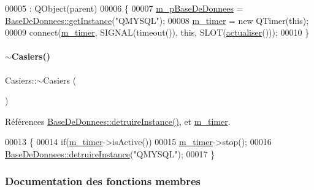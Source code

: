 \begin{DoxyCode}
00005                                 : QObject(parent)
00006 \{
00007     \hyperlink{class_casiers_ae6ac6b09a5cffe28291fc9b3289ff011}{m\_pBaseDeDonnees} = \hyperlink{class_base_de_donnees_a80028aa2b6b4fbf30fb2e36357b7d3d3}{BaseDeDonnees::getInstance}(\textcolor{stringliteral}{"QMYSQL"});
00008     \hyperlink{class_casiers_a2e2ee8b7f70d1c22acca56257d257ae6}{m\_timer} = \textcolor{keyword}{new} QTimer(\textcolor{keyword}{this});
00009     connect(\hyperlink{class_casiers_a2e2ee8b7f70d1c22acca56257d257ae6}{m\_timer}, SIGNAL(timeout()), \textcolor{keyword}{this}, SLOT(\hyperlink{class_casiers_a53ff5feefb50f5010943c94916be060f}{actualiser}()));
00010 \}
\end{DoxyCode}
\mbox{\label{class_casiers_a12018a7daf2c2ce7652ccedbefc545cc}} 
\paragraph{\texorpdfstring{$\sim$\+Casiers()}{~Casiers()}}
{\footnotesize\ttfamily Casiers\+::$\sim$\+Casiers (\begin{DoxyParamCaption}{ }\end{DoxyParamCaption})}



Références \hyperlink{class_base_de_donnees_a457401c0816b888c77ce915997545f4e}{Base\+De\+Donnees\+::detruire\+Instance()}, et \hyperlink{class_casiers_a2e2ee8b7f70d1c22acca56257d257ae6}{m\+\_\+timer}.


\begin{DoxyCode}
00013 \{
00014     \textcolor{keywordflow}{if}(\hyperlink{class_casiers_a2e2ee8b7f70d1c22acca56257d257ae6}{m\_timer}->isActive())
00015        \hyperlink{class_casiers_a2e2ee8b7f70d1c22acca56257d257ae6}{m\_timer}->stop();
00016     \hyperlink{class_base_de_donnees_a457401c0816b888c77ce915997545f4e}{BaseDeDonnees::detruireInstance}(\textcolor{stringliteral}{"QMYSQL"});    
00017 \}
\end{DoxyCode}


\subsubsection{Documentation des fonctions membres}
\mbox{\label{class_casiers_a53ff5feefb50f5010943c94916be060f}} 
